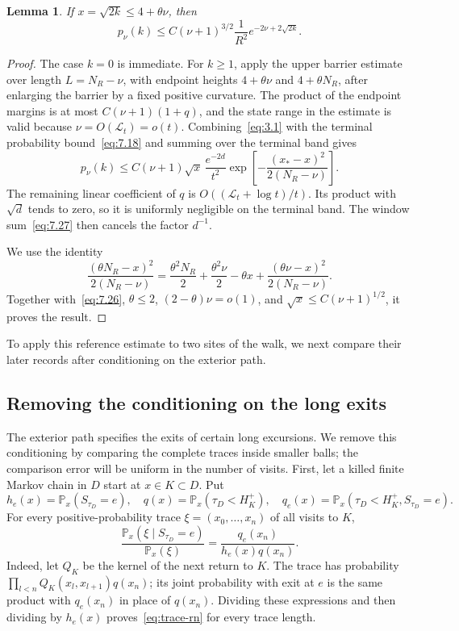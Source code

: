 \documentclass[11pt,letterpaper,reqno]{amsart}
\numberwithin{equation}{section}
\newtheorem{lemma}[theorem]{Lemma}
\theoremstyle{remark}
\begin{document}
\begin{lemma}\label{lem:continuation}
If $x=\sqrt{2k}\le4+\theta\nu$, then
\begin{equation}\label{eq:7.30}
p_{\nu}(k)\le C(\nu+1)^{3/2}\frac{1}{R^2}
 e^{-2\nu+2\sqrt{2k}}.
\end{equation}
\end{lemma}
\begin{proof}
The case $k=0$ is immediate. For $k\ge1$, apply the upper barrier estimate over length $L=N_R-\nu$, with endpoint heights $4+\theta\nu$ and $4+\theta N_R$, after enlarging the barrier by a fixed positive curvature. The product of the endpoint margins is at most $C(\nu+1)(1+q)$, and the state range in the estimate is valid because $\nu=O(\mathcal L_t)=o(t)$. Combining~\eqref{eq:3.1} with the terminal probability bound~\eqref{eq:7.18} and summing over the terminal band gives
\begin{equation}\label{eq:7.31}
p_{\nu}(k)\le C(\nu+1)\sqrt{x}\,\frac{e^{-2d}}{t^2}
\exp\left[-\frac{(x_*-x)^2}{2(N_R-\nu)}\right].
\end{equation}
The remaining linear coefficient of $q$ is $O((\mathcal L_t+\log t)/t)$. Its product with $\sqrt d$ tends to zero, so it is uniformly negligible on the terminal band. The window sum~\eqref{eq:7.27} then cancels the factor $d^{-1}$.

We use the identity
\begin{equation}\label{eq:7.32}
\frac{(\theta N_R-x)^2}{2(N_R-\nu)}
=\frac{\theta^2N_R}{2}+\frac{\theta^2\nu}{2}-\theta x
+\frac{(\theta \nu-x)^2}{2(N_R-\nu)}.
\end{equation}
Together with~\eqref{eq:7.26}, $\theta\le2$, $(2-\theta)\nu=o(1)$, and $\sqrt x\le C(\nu+1)^{1/2}$, it proves the result.
\end{proof}
To apply this reference estimate to two sites of the walk, we next compare their later records after conditioning on the exterior path.

\subsection{Removing the conditioning on the long exits}\label{sec:exterior}\label{sec:exitkernel}
The exterior path specifies the exits of certain long excursions. We remove this conditioning by comparing the complete traces inside smaller balls; the comparison error will be uniform in the number of visits. First, let a killed finite Markov chain in $D$ start at $x\in K\subset D$. Put
\[
 h_e(x)=\mathbb P_x(S_{\tau_D}=e),\quad
 q(x)=\mathbb P_x(\tau_D<H_K^+),\quad
 q_e(x)=\mathbb P_x(\tau_D<H_K^+,S_{\tau_D}=e).
\]
For every positive-probability trace $\xi=(x_0,\ldots,x_n)$ of all visits to $K$,
\begin{equation}\label{eq:trace-rn}
 \frac{\mathbb P_x(\xi\mid S_{\tau_D}=e)}{\mathbb P_x(\xi)}
 =\frac{q_e(x_n)}{h_e(x)q(x_n)}.
\end{equation}
Indeed, let $Q_K$ be the kernel of the next return to $K$. The trace has probability $\prod_{l<n}Q_K(x_l,x_{l+1})q(x_n)$; its joint probability with exit at $e$ is the same product with $q_e(x_n)$ in place of $q(x_n)$. Dividing these expressions and then dividing by $h_e(x)$ proves~\eqref{eq:trace-rn} for every trace length.
\end{document}
